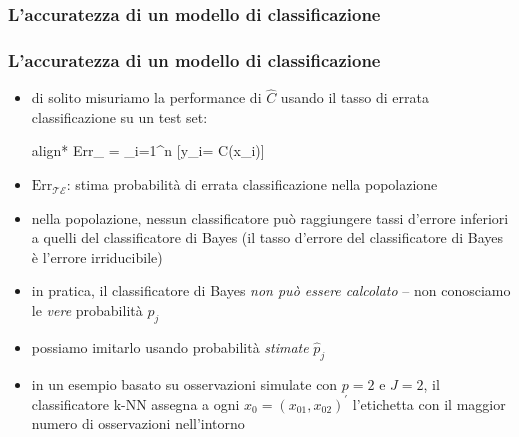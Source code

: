 

\subsubsection[L'accuratezza di un modello di classificazione]{L'accuratezza di un modello di classificazione}
\begin{frame}
	\frametitle{L'accuratezza di un modello di classificazione}

	\begin{itemize}
		\item di solito misuriamo la performance di $\hat C$ usando il tasso di errata classificazione su un test set:
			\begin{empheq}[box=\fcolorbox{blue!40!black!60}{yellow!10}]{align*}
			\mbox{Err}_{} =  \sum_{i=1}^n [\widetilde y_i\not= \hat C(\widetilde x_i)]
			\end{empheq}
		\item $\mbox{Err}_{\mathcal{TE}}$: stima probabilità di errata classificazione nella popolazione
		\item nella popolazione, nessun classificatore può raggiungere tassi d'errore inferiori a quelli del classificatore di Bayes (il tasso d'errore del classificatore di Bayes è l'errore irriducibile)
		\item in pratica, il classificatore di Bayes \emph{non può essere calcolato} -- non conosciamo le \emph{vere} probabilità $p_j$
		\item possiamo imitarlo usando probabilità \emph{stimate} $\widehat p_j$
		\item in un esempio basato su osservazioni simulate con $p=2$ e $J=2$, il classificatore k-NN assegna a ogni $x_0=(x_{01},x_{02})^\prime$ l'etichetta con il maggior numero di osservazioni nell'intorno
	\end{itemize}
\end{frame}


